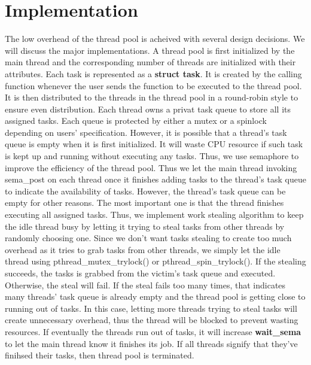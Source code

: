 \documentclass[journal, a4paper]{IEEEtran}
\begin{document}
\section{Implementation}
The low overhead of the thread pool is acheived with several design decisions. We will discuss the major implementations. A thread pool is first initialized by the main thread and the corresponding number of threads are initialized with their attributes. Each task is represented as a \textbf{struct task}. It is created by the calling function whenever the user sends the function to be executed to the thread pool. It is then distributed to the threads in the thread pool in a round-robin style to ensure even distribution. Each thread owns a privat task queue to store all its assigned tasks. Each queue is protected by either a mutex or a spinlock depending on users' specification. However, it is possible that a thread's task queue is empty when it is first initialized. It will waste CPU resource if such task is kept up and running without executing any tasks. Thus, we use semaphore to improve the efficiency of the thread pool. Thus we let the main thread invoking sema\_post on each thread once it finishes adding tasks to the thread's task queue to indicate the availability of tasks. However, the thread's task queue can be empty for other reasons. The most important one is that the thread finishes executing all assigned tasks. Thus, we implement work stealing algorithm to keep the idle thread busy by letting it trying to steal tasks from other threads by randomly choosing one. Since we don't want tasks stealing to create too much overhead as it tries to grab tasks from other threads, we simply let the idle thread using pthread\_mutex\_trylock() or pthread\_spin\_trylock(). If the stealing succeeds, the tasks is grabbed from the victim's task queue and executed. Otherwise, the steal will fail. If the steal fails too many times, that indicates many threads' task queue is already empty and the thread pool is getting close to running out of tasks. In this case, letting more threads trying to steal tasks will create unnecessary overhead, thus the thread will be blocked to prevent wasting resources. If eventually the threads run out of tasks, it will increase \textbf{wait\_sema} to let the main thread know it finishes its job. If all threads signify that they've finihsed their tasks, then thread pool is terminated.
\end{document}
